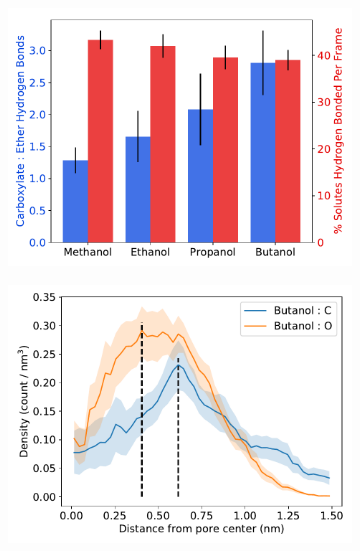 \documentclass[journal=jpcbfk,manuscript=article]{achemso}
\begin{document}
\begin{figure}[!htb]
\begin{subfigure}{0.45\textwidth}
  \includegraphics[width=\linewidth]{simple_alcohol_hbonds.pdf}
  \caption{}\label{fig:simple_alcohol_hbonds}
  \end{subfigure}
  \begin{subfigure}{0.45\textwidth}
  \includegraphics[width=\linewidth]{butanol_CO.pdf}
  \caption{}\label{fig:butanol_CO}
  \end{subfigure}

\end{figure}
\end{document}
